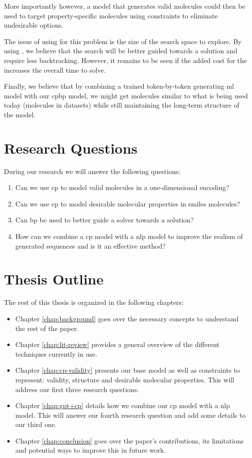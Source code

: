 \documentclass[../Document.tex]{subfiles}
\begin{document}
More importantly however, a \cp model that generates valid molecules could then be used to target property-specific molecules using constraints to eliminate undesirable options.

The issue of using \cp for this problem is the size of the search space to explore. By using \bp, we believe that the search will be better guided towards a solution and require less backtracking. However, it remains to be seen if the added cost for the \bp increases the overall time to solve.

Finally, we believe that by combining a trained token-by-token generating \gls{ml} model with our \gls{cpbp} model, we might get molecules similar to what is being used today (molecules in datasets) while still maintaining the long-term structure of the \cp model.


\section{Research Questions}
\label{sec:intro/questions}
During our research we will answer the following questions:

\begin{enumerate}
    \item Can we use \acrshort{cp} to model valid molecules in a one-dimensional encoding?
    \item Can we use \acrshort{cp} to model desirable molecular properties in \acrshort{smiles} molecules?
    \item Can \acrlong{bp} be used to better guide a solver towards a solution?
    \item How can we combine a \acrshort{cp} model with a \acrshort{nlp} model to improve the realism of generated sequences and is it an effective method?
\end{enumerate}

\section{Thesis Outline}
\label{sec:intro/outline}
The rest of this thesis is organized in the following chapters:

\begin{itemize}
    \item Chapter \ref{chap:background} goes over the necessary concepts to understand the rest of the paper.
    \item Chapter \ref{chap:lit-review} provides a general overview of the different techniques currently in use.
    \item Chapter \ref{chap:cp-validity} presents our base \cp model as well as constraints to represent: validity, structure and desirable molecular properties. This will address our first three research questions.
    \item Chapter \ref{chap:gpt+cp} details how we combine our \acrshort{cp} model with a \acrshort{nlp} model. This will answer our fourth research question and add some details to our third one.
    \item Chapter \ref{chap:conclusion} goes over the paper's contributions, its limitations and potential ways to improve this in future work.
\end{itemize}
\end{document}
